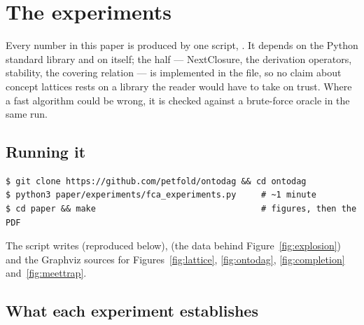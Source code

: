 \section{The experiments}
\label{sec:experiments}

Every number in this paper is produced by one script,
. It depends on the Python
standard library and on \odag{} itself; the \fca{} half --- NextClosure,
the derivation operators, stability, the covering relation --- is implemented
in the file, so no claim about concept lattices rests on a library the reader
would have to take on trust. Where a fast algorithm could be wrong, it is
checked against a brute-force oracle in the same run.

\subsection*{Running it}

\begin{lstlisting}
$ git clone https://github.com/petfold/ontodag && cd ontodag
$ python3 paper/experiments/fca_experiments.py     # ~1 minute
$ cd paper && make                                 # figures, then the PDF
\end{lstlisting}

The script writes  (reproduced below),
 (the data behind
Figure~\ref{fig:explosion}) and the Graphviz sources for
Figures~\ref{fig:lattice}, \ref{fig:ontodag}, \ref{fig:completion}
and~\ref{fig:meettrap}.

\subsection*{What each experiment establishes}

